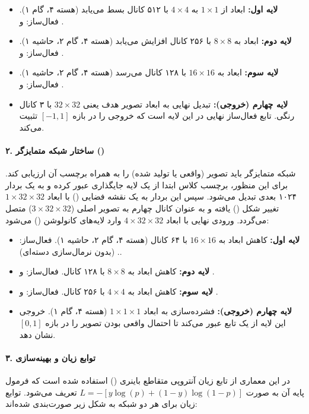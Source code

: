 \documentclass{article}
\begin{document}
\begin{itemize}
	\item \textbf{لایه اول:} ابعاد از $1 \times 1$ به $4 \times 4$ با ۵۱۲ کانال بسط می‌یابد (هسته ۴، گام ۱). فعال‌ساز:  و .
	\item \textbf{لایه دوم:} ابعاد به $8 \times 8$ با ۲۵۶ کانال افزایش می‌یابد (هسته ۴، گام ۲، حاشیه ۱). فعال‌ساز:  و .
	\item \textbf{لایه سوم:} ابعاد به $16 \times 16$ با ۱۲۸ کانال می‌رسد (هسته ۴، گام ۲، حاشیه ۱). فعال‌ساز:  و .
	\item \textbf{لایه چهارم (خروجی):} تبدیل نهایی به ابعاد تصویر هدف یعنی $32 \times 32$ با ۳ کانال رنگی. تابع فعال‌ساز نهایی در این لایه  است که خروجی را در بازه $[-1, 1]$ تثبیت می‌کند.
\end{itemize}

\paragraph{۲. ساختار شبکه متمایزگر ()}
شبکه متمایزگر باید تصویر (واقعی یا تولید شده) را به همراه برچسب آن ارزیابی کند. برای این منظور، برچسب کلاس ابتدا از یک لایه جایگذاری عبور کرده و به یک بردار ۱۰۲۴ بعدی تبدیل می‌شود. سپس این بردار به یک نقشه فضایی () با ابعاد $1 \times 32 \times 32$ تغییر شکل () یافته و به عنوان کانال چهارم به تصویر اصلی ($3 \times 32 \times 32$) متصل می‌گردد. ورودی نهایی با ابعاد $4 \times 32 \times 32$ وارد لایه‌های کانولوشن () می‌شود:

\begin{itemize}
	\item \textbf{لایه اول:} کاهش ابعاد به $16 \times 16$ با ۶۴ کانال (هسته ۴، گام ۲، حاشیه ۱). فعال‌ساز: . (بدون نرمال‌سازی دسته‌ای).
	\item \textbf{لایه دوم:} کاهش ابعاد به $8 \times 8$ با ۱۲۸ کانال. فعال‌ساز:  و .
	\item \textbf{لایه سوم:} کاهش ابعاد به $4 \times 4$ با ۲۵۶ کانال. فعال‌ساز:  و .
	\item \textbf{لایه چهارم (خروجی):} فشرده‌سازی به ابعاد $1 \times 1 \times 1$ (هسته ۴، گام ۱). خروجی این لایه از یک تابع  عبور می‌کند تا احتمال واقعی بودن تصویر را در بازه $[0, 1]$ نشان دهد.
\end{itemize}

\paragraph{۳. توابع زیان و بهینه‌سازی}
در این معماری از تابع زیان آنتروپی متقاطع باینری () استفاده شده است که فرمول پایه آن به صورت $L = -[y\log(p)+(1-y)\log(1-p)]$ تعریف می‌شود. توابع زیان برای هر دو شبکه به شکل زیر صورت‌بندی شده‌اند:
\end{document}
